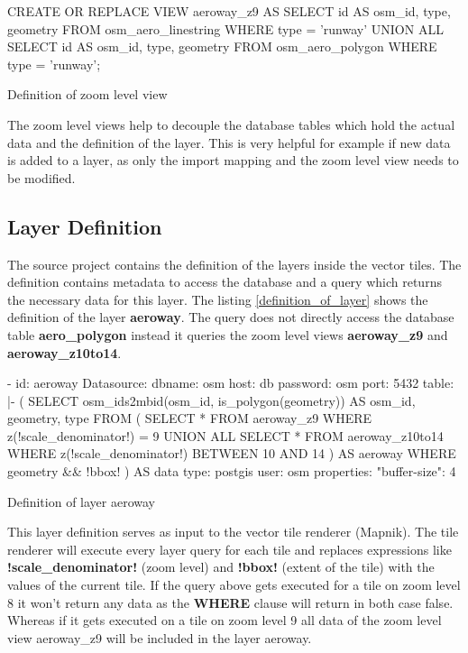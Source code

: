 \begin{listing}[H]
\begin{sqlcode}
CREATE OR REPLACE VIEW aeroway_z9 AS
    SELECT id AS osm_id, type, geometry
    FROM osm_aero_linestring
    WHERE type = 'runway'
    UNION ALL
    SELECT id AS osm_id, type, geometry
    FROM osm_aero_polygon
    WHERE type = 'runway';
\end{sqlcode}
\caption{Definition of zoom level view}
\label{definition_of_zoom_level_view}
\end{listing}

The zoom level views help to decouple the database tables which hold the actual data and the definition of the layer. This is very helpful for example if new data is added to a layer, as only the import mapping and the zoom level view needs to be modified.

\subsection{Layer Definition}

The source project contains the definition of the layers inside the vector tiles. The definition contains metadata to access the database and a query which returns the necessary data for this layer. The listing \autoref{definition_of_layer} shows the definition of the layer \textbf{aeroway}. The query does not directly access the database table \textbf{aero\_polygon} instead it queries the zoom level views \textbf{aeroway\_z9} and \textbf{aeroway\_z10to14}.

\begin{listing}[H]
\begin{yamlcode}
- id: aeroway
    Datasource: 
      dbname: osm
      host: db
      password: osm
      port: 5432
      table: |-
        (
          SELECT osm_ids2mbid(osm_id, is_polygon(geometry)) AS osm_id, geometry, type
          FROM (
            SELECT * FROM aeroway_z9
            WHERE z(!scale_denominator!) = 9
            UNION ALL
            SELECT * FROM aeroway_z10to14
            WHERE z(!scale_denominator!) BETWEEN 10 AND 14
          ) AS aeroway WHERE geometry && !bbox!
        ) AS data
      type: postgis
      user: osm
    properties: 
      "buffer-size": 4
\end{yamlcode}
\caption{Definition of layer aeroway}
\label{definition_of_layer}
\end{listing}

This layer definition serves as input to the vector tile renderer (Mapnik). The tile renderer will execute every layer query for each tile and replaces expressions like \textbf{!scale\_denominator!} (zoom level) and \textbf{!bbox!} (extent of the tile) with the values of the current tile. If the query above gets executed for a tile on zoom level 8 it won't return any data as the \textbf{WHERE} clause will return in both case false. Whereas if it gets executed on a tile on zoom level 9 all data of the zoom level view aeroway\_z9 will be included in the layer aeroway.


